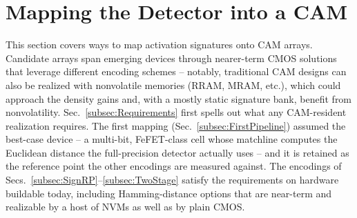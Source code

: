 \documentclass[conference]{IEEEtran}
\newcommand{\cam}{{CAM}\xspace}
\newcommand{\fefet}{{FeFET}\xspace}
\begin{document}


\section{Mapping the Detector into a CAM}
\label{sec:Mapping}

This section covers ways to map activation signatures onto \cam
arrays. Candidate arrays span emerging devices through nearer-term
CMOS solutions that leverage different encoding schemes -- notably,
traditional \cam designs can also be realized with nonvolatile
memories (RRAM, MRAM, etc.), which could approach the density gains
and, with a mostly static signature bank, benefit from
nonvolatility. Sec.~\ref{subsec:Requirements} first spells out what
any \cam-resident realization requires. The first mapping
(Sec.~\ref{subsec:FirstPipeline}) assumed the best-case device -- a
multi-bit, \fefet-class cell whose matchline computes the Euclidean
distance the full-precision detector actually uses -- and it is
retained as the reference point the other encodings are measured
against. The encodings of
Secs.~\ref{subsec:SignRP}--\ref{subsec:TwoStage} satisfy the
requirements on hardware buildable today, including Hamming-distance
options that are near-term and realizable by a host of NVMs as well
as by plain CMOS.
\end{document}
